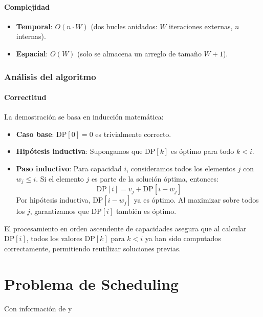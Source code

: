 \documentclass{report}
\begin{document}
\subsubsection*{Complejidad}
\begin{itemize}
    \item \textbf{Temporal}: $O(n \cdot W)$ (dos bucles anidados: $W$ iteraciones externas, $n$ internas).
    \item \textbf{Espacial}: $O(W)$ (solo se almacena un arreglo de tamaño $W+1$).
\end{itemize}

\subsection{Análisis del algoritmo}
\subsubsection*{Correctitud}
La demostración se basa en inducción matemática:

\begin{itemize}
    \item \textbf{Caso base}: $\text{DP}[0] = 0$ es trivialmente correcto.
    
    \item \textbf{Hipótesis inductiva}: Supongamos que $\text{DP}[k]$ es óptimo para todo $k < i$.
    
    \item \textbf{Paso inductivo}: Para capacidad $i$, consideramos todos los elementos $j$ con $w_j \leq i$. Si el elemento $j$ es parte de la solución óptima, entonces:
    \[
    \text{DP}[i] = v_j + \text{DP}[i - w_j]
    \]
    Por hipótesis inductiva, $\text{DP}[i - w_j]$ ya es óptimo. Al maximizar sobre todos los $j$, garantizamos que $\text{DP}[i]$ también es óptimo.
\end{itemize}

El procesamiento en orden ascendente de capacidades asegura que al calcular $\text{DP}[i]$, todos los valores $\text{DP}[k]$ para $k < i$ ya han sido computados correctamente, permitiendo reutilizar soluciones previas.



\chapter{Problema de Scheduling}
{Con información de \cite{Kleinberg2005} y \cite{Garey1979}\\\\}
\end{document}
